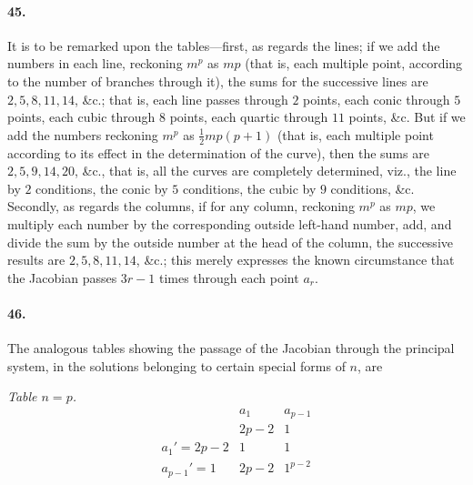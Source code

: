 \documentclass[11pt]{article}
\begin{document}
\bigskip

\paragraph{45.}
It is to be remarked upon the tables---first, as regards the lines; if we
add the numbers in each line, reckoning $m^{p}$ as $mp$ (that is, each
multiple point, according to the number of branches through it), the sums
for the successive lines are $2,5,8,11,14$, \&c.; that is, each line
passes through $2$ points, each conic through $5$ points, each cubic
through $8$ points, each quartic through $11$ points, \&c. But if we add
the numbers reckoning $m^{p}$ as $\tfrac{1}{2}mp(p+1)$ (that is, each
multiple point according to its effect in the determination of the
curve), then the sums are $2,5,9,14,20$, \&c., that is, all the curves
are completely determined, viz., the line by $2$ conditions, the conic by
$5$ conditions, the cubic by $9$ conditions, \&c. Secondly, as regards
the columns, if for any column, reckoning $m^{p}$ as $mp$, we multiply
each number by the corresponding outside left-hand number, add, and
divide the sum by the outside number at the head of the column, the
successive results are $2,5,8,11,14$, \&c.; this merely expresses the
known circumstance that the Jacobian passes $3r-1$ times through each
point $a_{r}$.

\medskip

\paragraph{46.}
The analogous tables showing the passage of the Jacobian through the
principal system, in the solutions belonging to certain special forms of
$n$, are

\medskip

\noindent\textit{Table $n=p$.}
\[
\begin{array}{l|cc}
                & a_{1}      & a_{p-1}\\
                & 2p-2       & 1\\
\hline
a_{1}'=2p-2     & 1          & 1\\
a_{p-1}'=1      & 2p-2       & 1^{p-2}
\end{array}
\]
\end{document}
